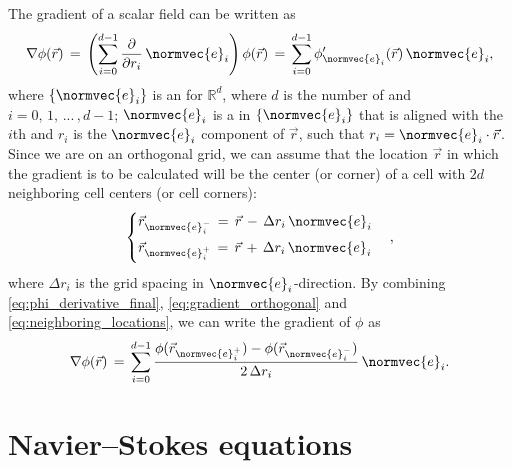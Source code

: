 The gradient of a scalar field can be written as
%
\begin{equation} \label{eq:gradient_orthogonal}
\nabla\phi(\vec{r}) \,=\, \left(\sum_{i=0}^{d-1}\frac{\partial}{\partial r_i}\,\normvec{e}_i\right) \phi(\vec{r}) \,=\, \sum_{i=0}^{d-1}\phi'_{\normvec{e}_i}(\vec{r})\,\normvec{e}_i,
\end{equation}
%
where $\{\normvec{e}_i\}$ is an  for $\mathbb{R}^d$, where $d$ is the number of \dimensions and $i = 0,\,1,\,...\,,d-1$; $\normvec{e}_i$ is a  in $\{\normvec{e}_i\}$ that is aligned with the $i$th  and $r_i$ is the $\normvec{e}_i$ component of $\vec{r}$,
such that $r_i = \normvec{e}_i\cdot\vec{r}$. Since we are on an orthogonal grid, we can assume that the location $\vec{r}$ in which the gradient is to be calculated will be the center (or corner) of a cell with $2d$ neighboring cell centers (or cell corners):
%
\begin{equation} \label{eq:neighboring_locations}
\begin{cases}
\vec{r}_{\normvec{e}_i^-} \,=\, \vec{r} \,-\, \Delta r_i\,\normvec{e}_i\\[1ex]
\vec{r}_{\normvec{e}_i^+} \,=\, \vec{r} \,+\, \Delta r_i\,\normvec{e}_i\\[1ex]
\end{cases},
\end{equation}
%
where $\Delta r_i$ is the grid spacing in $\normvec{e}_i$-direction. By combining  \ref{eq:phi_derivative_final}, \ref{eq:gradient_orthogonal} and \ref{eq:neighboring_locations}, we can write the gradient of $\phi$ as
%
\begin{equation} \label{eq:gradient_final}
\nabla\phi(\vec{r}) \,=\,
\sum_{i=0}^{d-1}\frac{\phi(\vec{r}_{\normvec{e}_i^+})-\phi(\vec{r}_{\normvec{e}_i^-})}{2\,\Delta r_i}\,\normvec{e}_i.
\end{equation}

\section{Navier--Stokes equations}
\label{sec:ns_equations}

